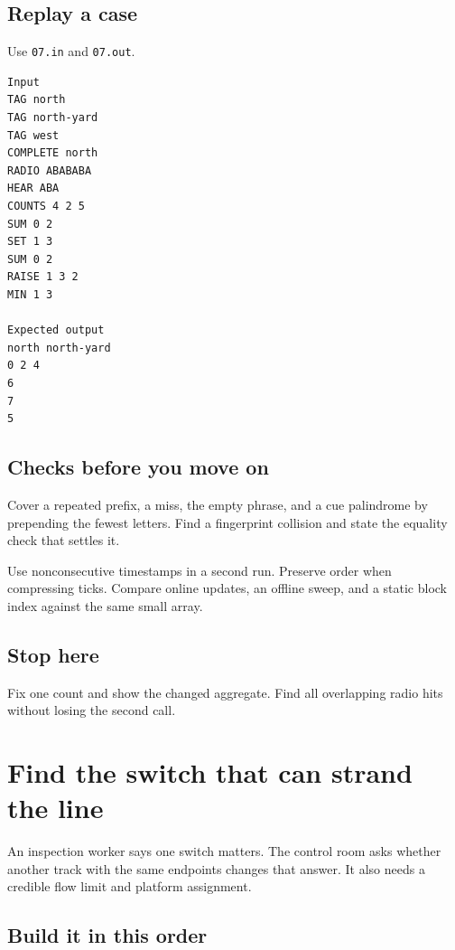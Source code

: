 \documentclass[11pt,letterpaper]{article}
\begin{document}
\subsection*{Replay a case}

Use \texttt{07.in} and \texttt{07.out}.

\begin{samepage}
\small
\begin{verbatim}
Input
TAG north
TAG north-yard
TAG west
COMPLETE north
RADIO ABABABA
HEAR ABA
COUNTS 4 2 5
SUM 0 2
SET 1 3
SUM 0 2
RAISE 1 3 2
MIN 1 3

Expected output
north north-yard
0 2 4
6
7
5
\end{verbatim}
\end{samepage}

\subsection*{Checks before you move on}

Cover a repeated prefix, a miss, the empty phrase, and a cue palindrome by prepending the fewest letters. Find a fingerprint collision and state the equality check that settles it.

Use nonconsecutive timestamps in a second run. Preserve order when compressing ticks. Compare online updates, an offline sweep, and a static block index against the same small array.

\subsection*{Stop here}

Fix one count and show the changed aggregate. Find all overlapping radio hits without losing the second call.

\clearpage

\section{Find the switch that can strand the line}\label{trains:08}

An inspection worker says one switch matters. The control room asks whether another track with the same endpoints changes that answer. It also needs a credible flow limit and platform assignment.

\subsection*{Build it in this order}
\end{document}

